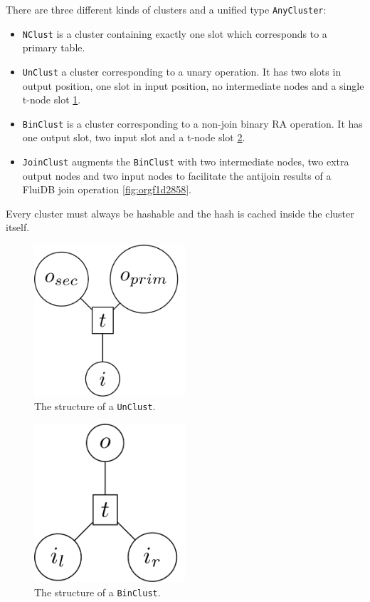 There are three different kinds of clusters and a unified type
\texttt{AnyCluster}:

\begin{itemize}
\item \texttt{NClust} is a cluster containing exactly one slot which corresponds
  to a primary table.
\item \texttt{UnClust} a cluster corresponding to a unary operation. It has two
  slots in output position, one slot in input position, no
  intermediate nodes and a single t-node slot \ref{fig:org8d8d9a2}.
\item \texttt{BinClust} is a cluster corresponding to a non-join binary RA
  operation. It has one output slot, two input slot and a t-node slot
  \ref{fig:org71a57f1}.
\item \texttt{JoinClust} augments the \texttt{BinClust} with two intermediate nodes, two
  extra output nodes and two input nodes to facilitate the antijoin
  results of a FluiDB join operation \ref{fig:orgf1d2858}.
\end{itemize}

Every cluster must always be hashable and the hash is cached inside
the cluster itself.

\begin{figure}[p]
  \centering
  \includegraphics[width=0.5\textwidth]{./imgs/unclust.pdf}
  \caption{\label{fig:org8d8d9a2}The structure of a \texttt{UnClust}.}
\end{figure}


\begin{figure}[p]
  \centering
  \includegraphics[width=0.5\textwidth]{./imgs/binclust.pdf}
  \caption{\label{fig:org71a57f1}The structure of a \texttt{BinClust}.}
\end{figure}



